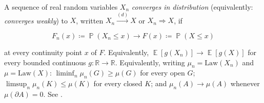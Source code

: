 \documentclass[11pt,a4paper]{article}
\DeclareMathOperator{\E}{\mathbb{E}}
\DeclareMathOperator{\Pbb}{\mathbb{P}}
\begin{document}
\begin{definition}
\label{def:conv-d}
A sequence of real random variables \(X_{n}\) \emph{converges in distribution} (equivalently: \emph{converges weakly}) to \(X\), written \(X_{n} \xrightarrow{(d)} X\) or \(X_{n} \Rightarrow X\), if

\[
F_{n}(x) \coloneqq \Pbb(X_{n} \le x)
\to
F(x) \coloneqq \Pbb(X \le x)
\]

at every continuity point \(x\) of \(F\). Equivalently, \(\E[g(X_{n})] \to \E[g(X)]\) for every bounded continuous \(g \colon \mathbb{R} \to \mathbb{R}\). Equivalently, writing \(\mu_{n} = \mathrm{Law}(X_{n})\) and \(\mu = \mathrm{Law}(X)\): \(\liminf_{n} \mu_{n}(G) \ge \mu(G)\) for every open \(G\); \(\limsup_{n} \mu_{n}(K) \le \mu(K)\) for every closed \(K\); and \(\mu_{n}(A) \to \mu(A)\) whenever \(\mu(\partial A) = 0\). See \citep[Theorems~3.2.3 and~3.2.5]{durrett2010}.
\end{definition}
\end{document}
